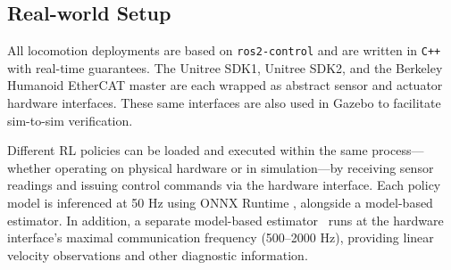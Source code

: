 \subsection{Real-world Setup}

All locomotion deployments are based on \texttt{ros2-control} and are written in \texttt{C++} with real-time guarantees. The Unitree SDK1, Unitree SDK2, and the Berkeley Humanoid EtherCAT master are each wrapped as abstract sensor and actuator hardware interfaces. These same interfaces are also used in Gazebo \cite{koenig2004design} to facilitate sim-to-sim verification.

Different RL policies can be loaded and executed within the same process—whether operating on physical hardware or in simulation—by receiving sensor readings and issuing control commands via the hardware interface. Each policy model is inferenced at 50 Hz using ONNX Runtime \cite{onnxruntime}, alongside a model-based estimator. In addition, a separate model-based estimator~\cite{Flayols_2017_estimator} runs at the hardware interface’s maximal communication frequency (500–2000 Hz), providing linear velocity observations and other diagnostic information.

\clearpage
